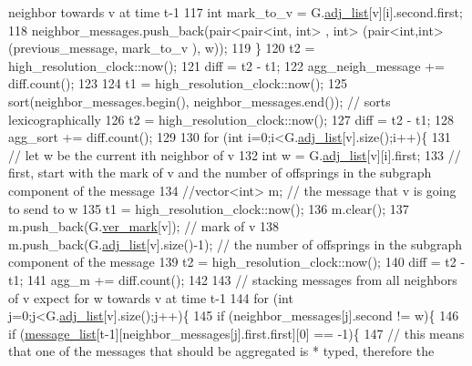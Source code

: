 \begin{DoxyCode}
{       neighbor towards v at time t-1}
117           \textcolor{keywordtype}{int} mark\_to\_v = G.\hyperlink{classmarked__graph_a1a0bf7ca413a278763f7c878b3b6fd6f}{adj\_list}[v][i].second.first;
118           neighbor\_messages.push\_back(pair<pair<int, int> , \textcolor{keywordtype}{int}> (pair<int,int>(previous\_message, mark\_to\_v
      ), w));
119         \}
120         t2 = high\_resolution\_clock::now();
121         diff = t2 - t1;
122         agg\_neigh\_message += diff.count();
123 
124         t1 = high\_resolution\_clock::now();
125         sort(neighbor\_messages.begin(), neighbor\_messages.end()); \textcolor{comment}{// sorts lexicographically}
126         t2 = high\_resolution\_clock::now();
127         diff = t2 - t1;
128         agg\_sort += diff.count();
129 
130         \textcolor{keywordflow}{for} (\textcolor{keywordtype}{int} i=0;i<G.\hyperlink{classmarked__graph_a1a0bf7ca413a278763f7c878b3b6fd6f}{adj\_list}[v].size();i++)\{
131           \textcolor{comment}{// let w be the current ith neighbor of v}
132           \textcolor{keywordtype}{int} w = G.\hyperlink{classmarked__graph_a1a0bf7ca413a278763f7c878b3b6fd6f}{adj\_list}[v][i].first;
133           \textcolor{comment}{// first, start with the mark of v and the number of offsprings in the subgraph component of the
       message}
134           \textcolor{comment}{//vector<int> m; // the message that v is going to send to w}
135           t1 = high\_resolution\_clock::now();
136           m.clear();
137           m.push\_back(G.\hyperlink{classmarked__graph_ac83e9377dd4d8bb95be1ac949b127296}{ver\_mark}[v]); \textcolor{comment}{// mark of v}
138           m.push\_back(G.\hyperlink{classmarked__graph_a1a0bf7ca413a278763f7c878b3b6fd6f}{adj\_list}[v].size()-1); \textcolor{comment}{// the number of offsprings in the subgraph
       component of the message}
139           t2 = high\_resolution\_clock::now();
140           diff = t2 - t1;
141           agg\_m += diff.count();
142 
143           \textcolor{comment}{// stacking messages from all neighbors of v expect for w towards v at time t-1}
144           \textcolor{keywordflow}{for} (\textcolor{keywordtype}{int} j=0;j<G.\hyperlink{classmarked__graph_a1a0bf7ca413a278763f7c878b3b6fd6f}{adj\_list}[v].size();j++)\{
145             \textcolor{keywordflow}{if} (neighbor\_messages[j].second != w)\{
146               \textcolor{keywordflow}{if} (\hyperlink{classgraph__message_aa17fdb629b423343edfafa97252763ef}{message\_list}[t-1][neighbor\_messages[j].first.first][0] == -1)\{
147                 \textcolor{comment}{// this means that one of the messages that should be aggregated is * typed, therefore the
}
\end{DoxyCode}
